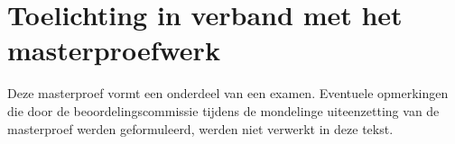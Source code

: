 \chapter*{Toelichting in verband met het masterproefwerk}

Deze masterproef vormt een onderdeel van een examen. Eventuele opmerkingen die door de beoordelingscommissie tijdens de mondelinge uiteenzetting van de masterproef werden geformuleerd, werden niet verwerkt in deze tekst.

